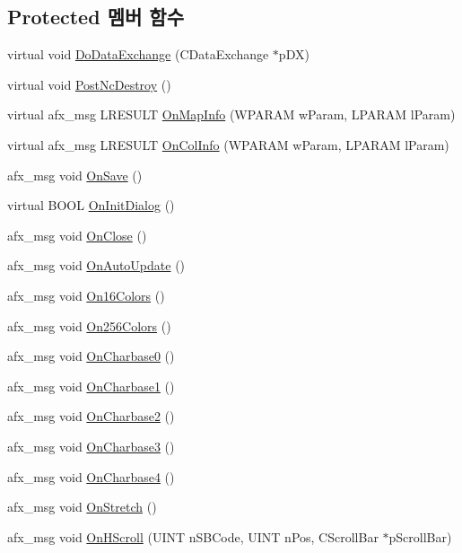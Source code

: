 \subsection*{Protected 멤버 함수}
\begin{DoxyCompactItemize}
\item 
virtual void \mbox{\hyperlink{class_tile_view_a6c10f973f1ebbb7169bd6440572a9328}{Do\+Data\+Exchange}} (C\+Data\+Exchange $\ast$p\+DX)
\item 
virtual void \mbox{\hyperlink{class_tile_view_a83fee9256658f418f7562c0ff098eb22}{Post\+Nc\+Destroy}} ()
\item 
virtual afx\+\_\+msg L\+R\+E\+S\+U\+LT \mbox{\hyperlink{class_tile_view_ae4ba4c47c672fb6e856fbe3921e3667e}{On\+Map\+Info}} (W\+P\+A\+R\+AM w\+Param, L\+P\+A\+R\+AM l\+Param)
\item 
virtual afx\+\_\+msg L\+R\+E\+S\+U\+LT \mbox{\hyperlink{class_tile_view_ad01d09783bbe107d9837d6847938e564}{On\+Col\+Info}} (W\+P\+A\+R\+AM w\+Param, L\+P\+A\+R\+AM l\+Param)
\item 
afx\+\_\+msg void \mbox{\hyperlink{class_tile_view_ae318b9ed3c7567dcbc897c77d063a0eb}{On\+Save}} ()
\item 
virtual B\+O\+OL \mbox{\hyperlink{class_tile_view_a597e32fa09187fe6ea909cca947bfbc1}{On\+Init\+Dialog}} ()
\item 
afx\+\_\+msg void \mbox{\hyperlink{class_tile_view_a88e865b649c2a32c403670cca70ed55c}{On\+Close}} ()
\item 
afx\+\_\+msg void \mbox{\hyperlink{class_tile_view_ab51dcedc72c43cf57133d4adcd264c10}{On\+Auto\+Update}} ()
\item 
afx\+\_\+msg void \mbox{\hyperlink{class_tile_view_a482139c5bc655015ba0700db5c04ec91}{On16\+Colors}} ()
\item 
afx\+\_\+msg void \mbox{\hyperlink{class_tile_view_a021f1139dccc2ec023a315ed1f4619e1}{On256\+Colors}} ()
\item 
afx\+\_\+msg void \mbox{\hyperlink{class_tile_view_a5b1b1e61396178f21ee28c6c7a779142}{On\+Charbase0}} ()
\item 
afx\+\_\+msg void \mbox{\hyperlink{class_tile_view_a4c2151cc553eabc4d08f8a8b6954aa72}{On\+Charbase1}} ()
\item 
afx\+\_\+msg void \mbox{\hyperlink{class_tile_view_ab50f2c2c7575222ee7e4bb72161bbda7}{On\+Charbase2}} ()
\item 
afx\+\_\+msg void \mbox{\hyperlink{class_tile_view_af0ec3a1a2c7e142612fe13d85c4faa63}{On\+Charbase3}} ()
\item 
afx\+\_\+msg void \mbox{\hyperlink{class_tile_view_abfd5f9562f84ae4903db87425788d410}{On\+Charbase4}} ()
\item 
afx\+\_\+msg void \mbox{\hyperlink{class_tile_view_afe0a1c444008b7e76d4669ffdda2e0bd}{On\+Stretch}} ()
\item 
afx\+\_\+msg void \mbox{\hyperlink{class_tile_view_a8ca2f73ad6c372183494c0870905b9ac}{On\+H\+Scroll}} (U\+I\+NT n\+S\+B\+Code, U\+I\+NT n\+Pos, C\+Scroll\+Bar $\ast$p\+Scroll\+Bar)
\end{DoxyCompactItemize}


